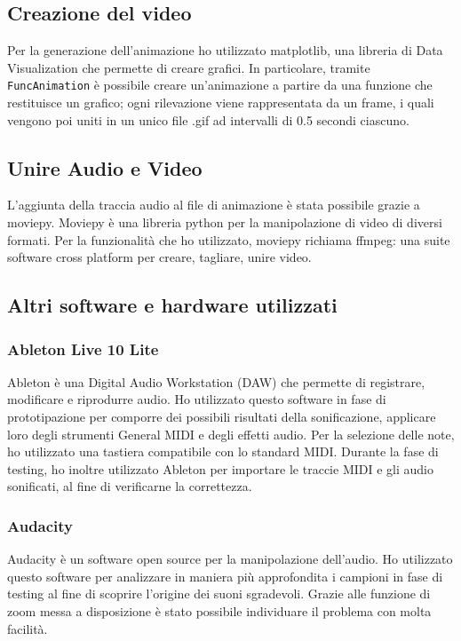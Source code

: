 \subsection{Creazione del video}
Per la generazione dell'animazione ho utilizzato matplotlib, una libreria di Data Visualization che permette di creare grafici.
In particolare, tramite \texttt{FuncAnimation} è possibile creare un'animazione a partire da una funzione che restituisce un grafico;
ogni rilevazione viene rappresentata da un frame, i quali vengono poi uniti in un unico file .gif ad intervalli di 0.5 secondi ciascuno.

\subsection{Unire Audio e Video}
L'aggiunta della traccia audio al file di animazione è stata possibile grazie a moviepy.
Moviepy è una libreria python per la manipolazione di video di diversi formati.
Per la funzionalità che ho utilizzato, moviepy richiama ffmpeg: una suite software cross platform per creare, tagliare, unire video.

\subsection{Altri software e hardware utilizzati}
\subsubsection{Ableton Live 10 Lite}
Ableton è una Digital Audio Workstation (DAW) che permette di registrare, modificare e riprodurre audio.
Ho utilizzato questo software in fase di prototipazione per comporre dei possibili risultati della sonificazione, applicare loro degli strumenti General MIDI e degli effetti audio.
Per la selezione delle note, ho utilizzato una tastiera compatibile con lo standard MIDI.
Durante la fase di testing, ho inoltre utilizzato Ableton per importare le traccie MIDI e gli audio sonificati, al fine di verificarne la correttezza.
\subsubsection{Audacity}
Audacity è un software open source per la manipolazione dell'audio.
Ho utilizzato questo software per analizzare in maniera più approfondita i campioni in fase di testing al fine di scoprire l'origine dei suoni sgradevoli.
Grazie alle funzione di zoom messa a disposizione è stato possibile individuare il problema con molta facilità.
